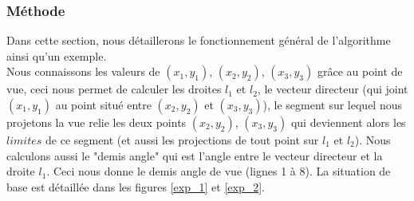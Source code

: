 \documentclass[11pt,a4paper]{article}
\theoremstyle{definition}
\theoremstyle{remark}
\begin{document}
\subsubsection{Méthode}
Dans cette section, nous détaillerons le fonctionnement général de l'algorithme ainsi qu'un exemple.\\

Nous connaissons les valeurs de $(x_1,y_1)$, $(x_2,y_2)$, $(x_3,y_3)$ grâce au point de vue, ceci nous permet de calculer les droites $l_1$ et $l_2$, le vecteur directeur (qui joint $(x_1,y_1)$ au point situé entre $(x_2,y_2)$ et $(x_3,y_3)$), le segment sur lequel nous projetons la vue relie les deux points $(x_2,y_2)$, $(x_3,y_3)$ qui deviennent alors les $limites$ de ce segment (et aussi les projections de tout point sur $l_1$ et $l_2$). Nous calculons aussi le "demis angle" qui est l'angle entre le vecteur directeur et la droite $l_1$. Ceci nous donne le demis angle de vue (lignes 1 à 8). La situation de base est détaillée dans les figures \ref{exp_1} et \ref{exp_2}.
\end{document}
